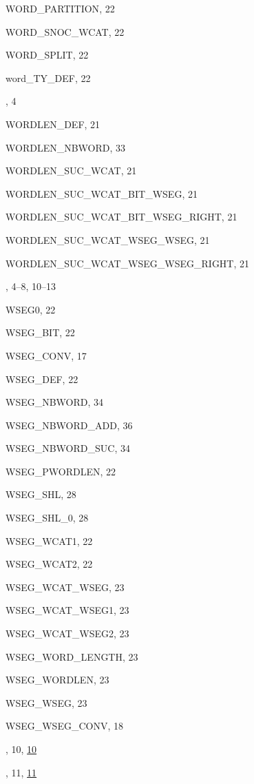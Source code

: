 \begin{theindex}
  \item {\ptt WORD\_PARTITION}, 22
  \item {\ptt WORD\_SNOC\_WCAT}, 22
  \item {\ptt WORD\_SPLIT}, 22
  \item {\ptt word\_TY\_DEF}, 22
  \item {}, 4
  \item {\ptt WORDLEN\_DEF}, 21
  \item {\ptt WORDLEN\_NBWORD}, 33
  \item {\ptt WORDLEN\_SUC\_WCAT}, 21
  \item {\ptt WORDLEN\_SUC\_WCAT\_BIT\_WSEG}, 21
  \item {\ptt WORDLEN\_SUC\_WCAT\_BIT\_WSEG\_RIGHT}, 21
  \item {\ptt WORDLEN\_SUC\_WCAT\_WSEG\_WSEG}, 21
  \item {\ptt WORDLEN\_SUC\_WCAT\_WSEG\_WSEG\_RIGHT}, 21
  \item {}, 4--8, 10--13
  \item {\ptt WSEG0}, 22
  \item {\ptt WSEG\_BIT}, 22
  \item {\ptt WSEG\_CONV}, 17
  \item {\ptt WSEG\_DEF}, 22
  \item {\ptt WSEG\_NBWORD}, 34
  \item {\ptt WSEG\_NBWORD\_ADD}, 36
  \item {\ptt WSEG\_NBWORD\_SUC}, 34
  \item {\ptt WSEG\_PWORDLEN}, 22
  \item {\ptt WSEG\_SHL}, 28
  \item {\ptt WSEG\_SHL\_0}, 28
  \item {\ptt WSEG\_WCAT1}, 22
  \item {\ptt WSEG\_WCAT2}, 22
  \item {\ptt WSEG\_WCAT\_WSEG}, 23
  \item {\ptt WSEG\_WCAT\_WSEG1}, 23
  \item {\ptt WSEG\_WCAT\_WSEG2}, 23
  \item {\ptt WSEG\_WORD\_LENGTH}, 23
  \item {\ptt WSEG\_WORDLEN}, 23
  \item {\ptt WSEG\_WSEG}, 23
  \item {\ptt WSEG\_WSEG\_CONV}, 18
  \item {}, 10, \ul{10}
  \item {}, 11, \ul{11}

\end{theindex}
